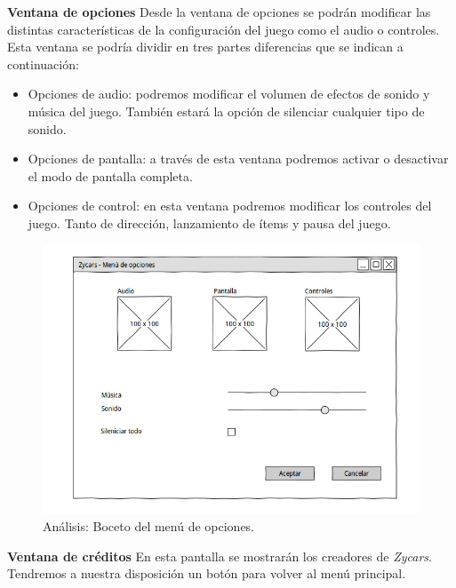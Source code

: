 \begin{description}
    \item \textbf{Ventana de opciones} Desde la ventana de opciones se podrán
    modificar las distintas características de la 
    configuración del juego como el audio o controles. Esta ventana se podría dividir en tres partes diferencias que se indican
    a continuación:
        \begin{itemize}
            \item Opciones de audio: podremos modificar el volumen de efectos de sonido y música del juego. También estará la opción
            de silenciar cualquier tipo de sonido.
            
            \item Opciones de pantalla: a través de esta ventana podremos activar o desactivar el modo de pantalla completa.
            
            \item Opciones de control: en esta ventana podremos modificar los controles del juego. Tanto de dirección, lanzamiento
            de ítems y pausa del juego.
        \end{itemize}

        \begin{figure}[H]
          \label{diagrama_casos_uso}
          \begin{center}
            \includegraphics[scale=0.42]{imagenes/analisis/boceto_opciones.png}
          \end{center}
          \caption{Análisis: Boceto del menú de opciones.}
        \end{figure}

    \item \textbf{Ventana de créditos} En esta pantalla se mostrarán los creadores de \emph{Zycars}. Tendremos a nuestra 
    disposición un botón para volver al menú principal.


\end{description}
